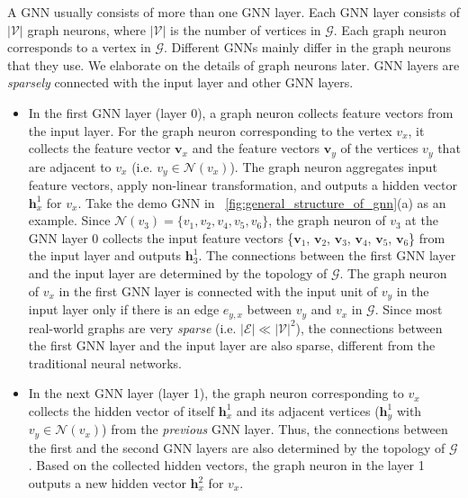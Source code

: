 A GNN usually consists of more than one GNN layer.
%
Each GNN layer consists of $|\mathcal{V}|$ graph neurons, where $|\mathcal{V}|$ is the number of vertices in $\mathcal{G}$.
%
Each graph neuron corresponds to a vertex in $\mathcal{G}$.
%
Different GNNs mainly differ in the graph neurons that they use.
%
We elaborate on the details of graph neurons later.
%
GNN layers are \emph{sparsely} connected with the input layer and other GNN layers.
%
\begin{itemize}
    \item In the first GNN layer (layer 0), a graph neuron collects feature vectors from the input layer.
    For the graph neuron corresponding to the vertex $v_x$, it collects the feature vector $\boldsymbol{v}_x$ and the feature vectors $\boldsymbol{v}_y$ of the vertices $v_y$ that are adjacent to $v_x$ (i.e.  $v_y \in \mathcal{N}(v_x)$).
    The graph neuron aggregates input feature vectors, apply non-linear transformation, and outputs a hidden vector $\boldsymbol{h}^1_x$ for $v_x$.
    Take the demo GNN in \figurename~\ref{fig:general_structure_of_gnn}(a) as an example.
    Since $\mathcal{N}(v_3) = \{v_1, v_2, v_4, v_5, v_6\}$, the graph neuron of $v_3$ at the GNN layer 0 collects the input feature vectors \{$\boldsymbol{v}_1$, $\boldsymbol{v}_2$, $\boldsymbol{v}_3$, $\boldsymbol{v}_4$, $\boldsymbol{v}_5$, $\boldsymbol{v}_6$\} from the input layer and outputs $\boldsymbol{h}^1_3$.
    The connections between the first GNN layer and the input layer  are determined by the topology of $\mathcal{G}$.
    The graph neuron of $v_x$ in the first GNN layer is connected with the input unit of $v_y$  in the input layer only if there is an edge $e_{y,x}$ between $v_y$ and $v_x$ in $\mathcal{G}$.
    Since most real-world graphs are very \emph{sparse} (i.e. $|\mathcal{E}| \ll |\mathcal{V}|^2$), the connections between the first GNN layer and the input layer are also sparse, different from the traditional neural networks.
    
    \item In the next GNN layer (layer 1), the graph neuron corresponding to $v_x$ collects the hidden vector of itself $\boldsymbol{h}^1_x$ and its adjacent vertices ($\boldsymbol{h}^1_y$ with $v_y \in \mathcal{N}(v_x)$) from the \emph{previous} GNN layer.
    Thus, the connections between the first and the second GNN layers are also determined by the topology of $\mathcal{G}$.
    Based on the collected hidden vectors, the graph neuron in the layer 1 outputs a new hidden vector $\boldsymbol{h}^2_x$ for $v_x$.
   

\end{itemize}
